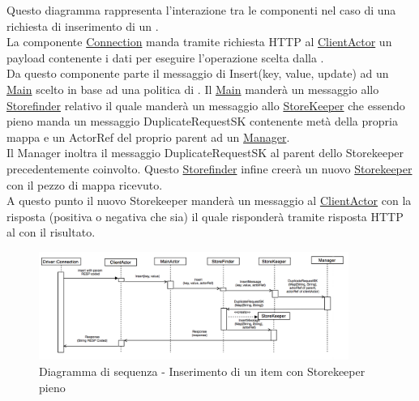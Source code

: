 \documentclass{scalatekids-article}
\begin{document}
Questo diagramma rappresenta l'interazione tra le componenti nel caso di una richiesta di inserimento di un .\\
La componente \hyperref[sec:actorbase::driver::client::Connection]{Connection}
manda tramite richiesta HTTP al \hyperref[sec:actorbase::actorsystem::actors::clientactor::ClientActor]{ClientActor}
un payload contenente i dati per eseguire l'operazione scelta dalla .\\
Da questo componente parte il messaggio di Insert(key, value, update) ad un \hyperref[sec:actorbase::actorsystem::actors::main::Main]{Main} scelto in base
ad una politica di .
Il \hyperref[sec:actorbase::actorsystem::actors::main::Main]{Main} manderà un messaggio allo \hyperref[sec:actorbase::actorsystem::actors::storefinder::Storefinder]{Storefinder} relativo il quale manderà
un messaggio allo \hyperref[sec:actorbase::actorsystem::actors::storekeeper::StoreKeeper]{StoreKeeper} che essendo pieno manda un
messaggio DuplicateRequestSK contenente metà della propria mappa e un ActorRef del proprio parent ad un
\hyperref[sec:actorbase::actorsystem::actors::manager::Manager]{Manager}.\\
Il Manager inoltra il messaggio DuplicateRequestSK al parent dello Storekeeper precedentemente coinvolto.
Questo \hyperref[sec:actorbase::actorsystem::actors::storefinder::Storefinder]{Storefinder} infine creerà un nuovo
\hyperref[sec:actorbase::actorsystem::actors::storekeeper::Storekeeper]{Storekeeper} con il pezzo di mappa ricevuto.\\
A questo punto il nuovo Storekeeper manderà un messaggio al \hyperref[sec:actorbase::actorsystem::actors::clientactor::ClientActor]{ClientActor} con
la risposta (positiva o negativa che sia) il quale risponderà tramite risposta HTTP al  con il risultato.
\begin{figure}[H]
  \begin{center}
    \includegraphics[width=0.9\textwidth, keepaspectratio]{img/diagrammiSequenza/esempioInsertFull.png}
    \caption{Diagramma di sequenza - Inserimento di un item con Storekeeper pieno}
  \end{center}
\end{figure}
\end{document}
